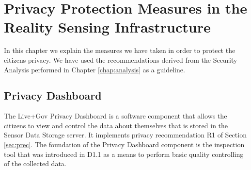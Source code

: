 \chapter{Privacy Protection Measures in the Reality Sensing Infrastructure}
\label{chap:impl}

In this chapter we explain the measures we have taken in order to
protect the citizens privacy. We have used the recommendations derived
from the Security Analysis performed in Chapter \ref{chap:analysis} as
a guideline.

\section{Privacy Dashboard}
The Live+Gov Privacy Dashboard is a software component that allows the
citizens to view and control the data about themselves that is stored
in the Sensor Data Storage server. It implements privacy
recommendation R1 of Section \ref{sec:prec}.  The foundation of the
Privacy Dashboard component is the inspection tool that was introduced
in D1.1 as a means to perform basic quality controlling of the
collected data.

